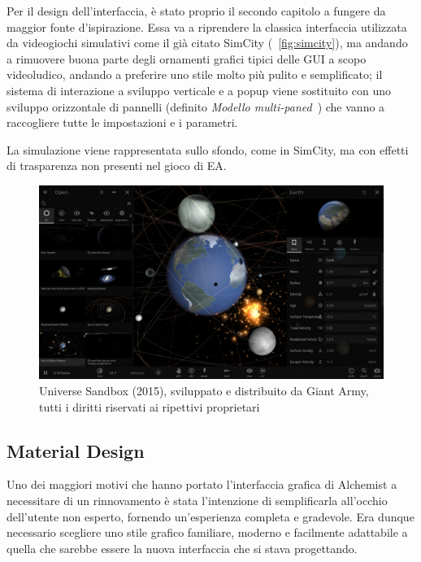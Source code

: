 
                Per il design dell'interfaccia, è stato proprio il secondo capitolo a fungere da maggior fonte d'ispirazione. Essa va a riprendere la classica interfaccia utilizzata da videogiochi simulativi come il già citato SimCity (\figurename~\ref{fig:simcity}), ma andando a rimuovere buona parte degli ornamenti grafici tipici delle GUI a scopo videoludico, andando a preferire uno stile molto più pulito e semplificato; il sistema di interazione a sviluppo verticale e a popup viene sostituito con uno sviluppo orizzontale di pannelli (definito \emph{Modello multi-paned}~\cite{multipanedmodel}) che vanno a raccogliere tutte le impostazioni e i parametri.

                La simulazione viene rappresentata sullo sfondo, come in SimCity, ma con effetti di trasparenza non presenti nel gioco di EA.


                \begin{figure}[htbp]
                    \centering
                    \includegraphics[scale=0.35]{img/universesandboxpanels}
                    \caption{Universe Sandbox (2015), sviluppato e distribuito da Giant Army, tutti i diritti riservati ai ripettivi proprietari}
                    \label{fig:universesandboxpanels}
                \end{figure}

        \subsection{Material Design}\label{sub:material}
            Uno dei maggiori motivi che hanno portato l'interfaccia grafica di Alchemist a necessitare di un rinnovamento è stata l'intenzione di semplificarla all'occhio dell'utente non esperto, fornendo un'esperienza completa e gradevole.
            Era dunque necessario scegliere uno stile grafico familiare, moderno e facilmente adattabile a quella che sarebbe essere la nuova interfaccia che si stava progettando.

